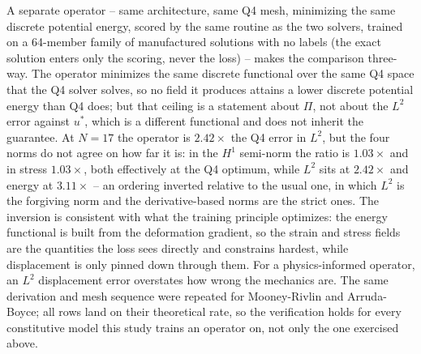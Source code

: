 \documentclass[final,5p,times]{elsarticle}
\begin{document}
A separate operator -- same architecture, same Q4 mesh, minimizing the
same discrete potential energy, scored by the same routine as the two
solvers, trained on a 64-member family of manufactured solutions with no
labels (the exact solution enters only the scoring, never the loss) --
makes the comparison three-way. The operator minimizes the same discrete
functional over the same Q4 space that the Q4 solver solves, so no field
it produces attains a lower discrete potential energy than Q4 does; but
that ceiling is a statement about $\Pi$, not about the $L^2$ error against
$u^\ast$, which is a different functional and does not inherit the
guarantee. At $N{=}17$ the operator is $2.42\times$ the Q4 error in
$L^2$, but the four norms do not agree on how far it is: in the $H^1$
semi-norm the ratio is $1.03\times$ and in stress $1.03\times$, both
effectively at the Q4 optimum, while $L^2$ sits at $2.42\times$ and energy
at $3.11\times$ -- an ordering inverted relative to the usual one, in
which $L^2$ is the forgiving norm and the derivative-based norms are the
strict ones. The inversion is consistent with what the training principle
optimizes: the energy functional is built from the deformation gradient,
so the strain and stress fields are the quantities the loss sees directly
and constrains hardest, while displacement is only pinned down through
them. For a physics-informed operator, an $L^2$ displacement error
overstates how wrong the mechanics are. The same derivation and mesh
sequence were repeated for Mooney-Rivlin and Arruda-Boyce; all rows land
on their theoretical rate, so the verification holds for every
constitutive model this study trains an operator on, not only the one
exercised above.
\end{document}

